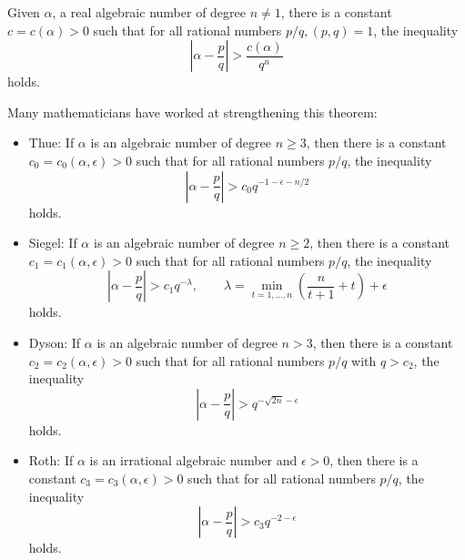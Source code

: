 \documentclass[12pt]{article}
\begin{document}
Given $\alpha$, a real algebraic number of degree $n \neq 1$, there is a constant $c = c( \alpha ) > 0$ such that for all rational numbers $p/q, (p,q)=1$, the inequality
\[ \left| \alpha - \frac{p}{q} \right| > \frac{c(\alpha )}{q^n} \] holds.

Many mathematicians have worked at strengthening this theorem:
\begin{itemize}
\item Thue: If $\alpha$ is an algebraic number of degree $n \geq 3$, then there is a constant $c_0 = c_0( \alpha , \epsilon ) > 0$ such that for all rational numbers $p/q$, the inequality
\[ \left| \alpha - \frac{p}{q} \right| > c_0 q^{-1- \epsilon - n/2} \] holds.

\item Siegel: If $\alpha$ is an algebraic number of degree $n \geq 2$, then there is a constant $c_1 = c_1( \alpha , \epsilon ) > 0$ such that for all rational numbers $p/q$, the inequality
\[ \left| \alpha - \frac{p}{q} \right| > c_1 q^{- \lambda}, \qquad \lambda = {\min}_{t=1,\ldots ,n} \left( \frac{n}{t+1} + t \right) + \epsilon \] holds.

\item Dyson: If $\alpha$ is an algebraic number of degree $n > 3$, then there is a constant $c_2 = c_2( \alpha , \epsilon ) > 0$ such that for all rational numbers $p/q$ with $q > c_2$, the inequality
\[ \left| \alpha - \frac{p}{q} \right| > q^{- \sqrt{2n}- \epsilon } \] holds.

\item Roth: If $\alpha$ is an irrational algebraic number and $\epsilon > 0$, then there is a constant $c_3 = c_3( \alpha , \epsilon ) > 0$ such that for all rational numbers $p/q$, the inequality
\[ \left| \alpha - \frac{p}{q} \right| > c_3 q^{-2 - \epsilon } \] holds.

\end{itemize}
\end{document}
